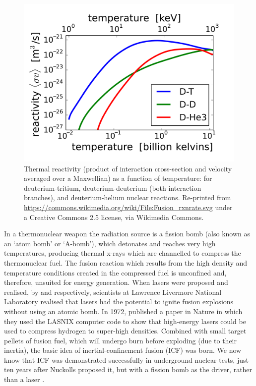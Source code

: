 \begin{figure}
 \centering
 \includegraphics[width=0.7\columnwidth]{Chapters/C1_Introduction/crossSection.png}
 \caption{Thermal reactivity (product of interaction cross-section and velocity averaged over a Maxwellian) as a function of temperature: for deuterium-tritium, deuterium-deuterium (both interaction branches), and deuterium-helium nuclear reactions. Re-printed from \url{https://commons.wikimedia.org/wiki/File:Fusion_rxnrate.svg} under a Creative Commons 2.5 license, via Wikimedia Commons.} \label{fig:crossSection}
\end{figure}

In a thermonuclear weapon the radiation source is a fission bomb (also known as an `atom bomb' or `A-bomb'), which detonates and reaches very high temperatures, producing thermal x-rays which are channelled to compress the thermonuclear fuel. The fusion reaction which results from the high density and temperature conditions created in the compressed fuel is unconfined and, therefore, unsuited for energy generation. When lasers were proposed and realised, by \citet{Maser1958} and \citet{Maiman1960} respectively, scientists at Lawrence Livermore National Laboratory realised that lasers had the potential to ignite fusion explosions without using an atomic bomb. In 1972, \citet{Nuckolls1972} published a paper in Nature in which they used the LASNIX computer code to show that high-energy lasers could be used to compress hydrogen to super-high densities. Combined with small target pellets of fusion fuel, which will undergo burn before exploding (due to their inertia), the basic idea of inertial-confinement fusion (\acrshort{ICF}) was born. We now know that \acrshort{ICF} was demonstrated successfully in underground nuclear tests, just ten years after Nuckolls proposed it, but with a fission bomb as the driver, rather than a laser \citep{Evans2010}.




